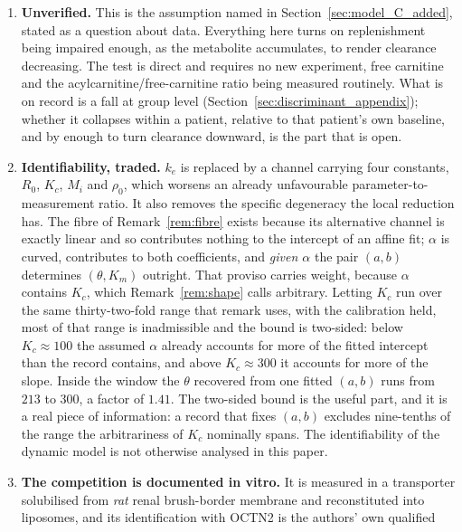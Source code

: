 \begin{enumerate}[leftmargin=*, itemsep=2pt]
\item \textbf{Unverified.} This is the assumption named in
      Section~\ref{sec:model_C_added}, stated as a question about data. Everything here
      turns on replenishment being impaired enough, as the metabolite accumulates, to
      render clearance decreasing. The test is direct and
      requires no new experiment, free carnitine and the acylcarnitine/free-carnitine ratio
      being measured routinely. What is on record is a fall at group level
      (Section~\ref{sec:discriminant_appendix}); whether it collapses within a patient, relative to
      that patient's own baseline, and by enough to turn clearance downward, is the part
      that is open.
\item \textbf{Identifiability, traded.} $k_e$ is replaced by a
      channel carrying four constants, $R_0$, $K_c$, $M_i$ and $\rho_0$, which worsens an
      already unfavourable parameter-to-measurement ratio. It also removes the specific
      degeneracy the local reduction has. The fibre of Remark~\ref{rem:fibre} exists because its
      alternative channel is exactly linear and so contributes nothing to the intercept of
      an affine fit; $\alpha$ is curved, contributes to both coefficients, and
      \emph{given $\alpha$} the pair $(a,b)$ determines $(\theta, K_m)$ outright. That
      proviso carries weight, because $\alpha$ contains $K_c$, which
      Remark~\ref{rem:shape} calls arbitrary. Letting $K_c$ run over the same
      thirty-two-fold range that remark uses, with the calibration held, most of
      that range is inadmissible and the bound is two-sided: below $K_c \approx 100$ the
      assumed $\alpha$ already accounts for more of the fitted intercept than the record
      contains, and above $K_c \approx 300$ it accounts for more of the slope. Inside the
      window the $\theta$ recovered from one fitted $(a,b)$ runs from $213$ to $300$, a
      factor of $1.41$. The two-sided bound is the useful part, and it is a real piece of
      information: a record that fixes $(a,b)$ excludes nine-tenths of the range the
      arbitrariness of $K_c$ nominally spans. The identifiability of the dynamic model is
      not otherwise analysed in this paper.
\item \textbf{The competition is documented in vitro.} It is measured in a transporter
      solubilised from \emph{rat} renal brush-border membrane and reconstituted into
      liposomes, and its identification with OCTN2 is the authors' own qualified

\end{enumerate}
